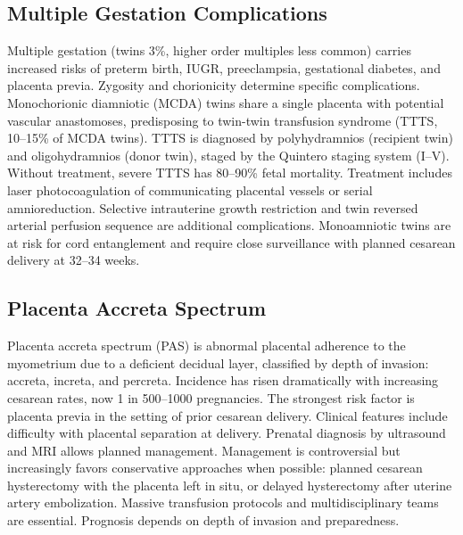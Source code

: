 \subsection{Multiple Gestation Complications}
\label{sec:Multiple Gestation Complications}
Multiple gestation (twins 3\%, higher order multiples less common) carries increased risks of preterm birth, IUGR, preeclampsia, gestational diabetes, and placenta previa. Zygosity and chorionicity determine specific complications. Monochorionic diamniotic (MCDA) twins share a single placenta with potential vascular anastomoses, predisposing to twin-twin transfusion syndrome (TTTS, 10--15\% of MCDA twins). TTTS is diagnosed by polyhydramnios (recipient twin) and oligohydramnios (donor twin), staged by the Quintero staging system (I--V). Without treatment, severe TTTS has 80--90\% fetal mortality. Treatment includes laser photocoagulation of communicating placental vessels or serial amnioreduction. Selective intrauterine growth restriction and twin reversed arterial perfusion sequence are additional complications. Monoamniotic twins are at risk for cord entanglement and require close surveillance with planned cesarean delivery at 32--34 weeks.

\subsection{Placenta Accreta Spectrum}
\label{sec:Placenta Accreta Spectrum}
Placenta accreta spectrum (PAS) is abnormal placental adherence to the myometrium due to a deficient decidual layer, classified by depth of invasion: accreta, increta, and percreta. Incidence has risen dramatically with increasing cesarean rates, now 1 in 500--1000 pregnancies. The strongest risk factor is placenta previa in the setting of prior cesarean delivery. Clinical features include difficulty with placental separation at delivery. Prenatal diagnosis by ultrasound and MRI allows planned management. Management is controversial but increasingly favors conservative approaches when possible: planned cesarean hysterectomy with the placenta left in situ, or delayed hysterectomy after uterine artery embolization. Massive transfusion protocols and multidisciplinary teams are essential. Prognosis depends on depth of invasion and preparedness.


